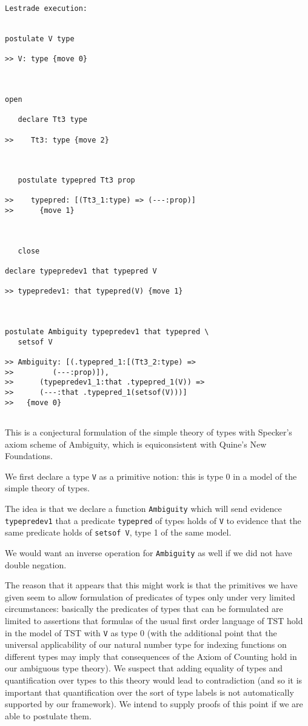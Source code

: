 \documentclass[12pt]{article}
\begin{document}
\begin{verbatim}Lestrade execution:


postulate V type

>> V: type {move 0}



open

   declare Tt3 type

>>    Tt3: type {move 2}



   postulate typepred Tt3 prop

>>    typepred: [(Tt3_1:type) => (---:prop)]
>>      {move 1}



   close

declare typepredev1 that typepred V

>> typepredev1: that typepred(V) {move 1}



postulate Ambiguity typepredev1 that typepred \
   setsof V

>> Ambiguity: [(.typepred_1:[(Tt3_2:type) =>
>>         (---:prop)]),
>>      (typepredev1_1:that .typepred_1(V)) =>
>>      (---:that .typepred_1(setsof(V)))]
>>   {move 0}


\end{verbatim}

This is a conjectural formulation of the simple theory of types with Specker's axiom scheme of Ambiguity, which is equiconsistent with Quine's New Foundations.



We first declare a type {\tt V} as a primitive notion:  this is type 0 in a model of the simple theory of types.

The idea is that we declare a function {\tt Ambiguity} which will send evidence {\tt typepredev1} that a predicate {\tt typepred} of types holds of {\tt V}
to evidence that the same predicate holds of {\tt setsof V}, type 1 of the same model.  

We would want an inverse operation for {\tt Ambiguity} as well if we did not have double negation.

The reason that it appears that this might work is that the primitives we have given seem to allow formulation of predicates of types only under very limited circumstances:  basically the predicates of types that can be formulated are limited to assertions that formulas of the usual first order language of TST hold in the model of TST with {\tt V} as type 0 (with the additional point that the universal applicability of our natural number type for indexing functions on different types may imply that consequences of the Axiom of Counting hold in our ambiguous type theory).    We suspect that adding equality of types and quantification over types to this theory would lead to contradiction (and so it is important that quantification over the sort of type labels is not automatically supported by our framework).  We intend to supply proofs of this point if we are able to postulate them.
\end{document}
